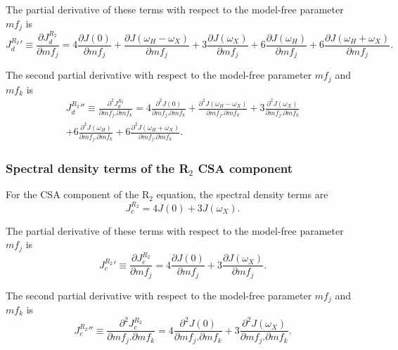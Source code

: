 \noindent The partial derivative of these terms with respect to the model-free parameter $mf_j$ is
\begin{equation}
    {J_d^{R_2}}' \equiv \frac{\partial J_d^{R_2}}{\partial mf_j}
        = 4 \frac{\partial J(0)}{\partial mf_j}
        + \frac{\partial J(\omega_H - \omega_X)}{\partial mf_j}
        + 3 \frac{\partial J(\omega_X)}{\partial mf_j}
        + 6 \frac{\partial J(\omega_H)}{\partial mf_j}
        + 6 \frac{\partial J(\omega_H + \omega_X)}{\partial mf_j}.  \label{eq: J terms: JR2d'}
\end{equation}

\noindent The second partial derivative with respect to the model-free parameter $mf_j$ and $mf_k$ is
\begin{multline}
    {J_d^{R_2}}'' \equiv \frac{\partial^2 J_d^{R_2}}{\partial mf_j . \partial mf_k}
        = 4 \frac{\partial^2 J(0)}{\partial mf_j . \partial mf_k}
        + \frac{\partial^2 J(\omega_H - \omega_X)}{\partial mf_j . \partial mf_k}
        + 3 \frac{\partial^2 J(\omega_X)}{\partial mf_j . \partial mf_k} \\
        + 6 \frac{\partial^2 J(\omega_H)}{\partial mf_j . \partial mf_k}
        + 6 \frac{\partial^2 J(\omega_H + \omega_X)}{\partial mf_j . \partial mf_k}.  \label{eq: J terms: JR2d"}
\end{multline}


\subsubsection{Spectral density terms of the R$_2$ CSA component}

For the CSA component of the R$_2$ equation, the spectral density terms are
\begin{equation}
    J_c^{R_2} = 4J(0) + 3J(\omega_X).  \label{eq: J terms: JR2c}
\end{equation}

\noindent The partial derivative of these terms with respect to the model-free parameter $mf_j$ is
\begin{equation}
    {J_c^{R_2}}' \equiv \frac{\partial J_c^{R_2}}{\partial mf_j}
        = 4 \frac{\partial J(0)}{\partial mf_j}
        + 3 \frac{\partial J(\omega_X)}{\partial mf_j}.  \label{eq: J terms: JR2c'}
\end{equation}

\noindent The second partial derivative with respect to the model-free parameter $mf_j$ and $mf_k$ is
\begin{equation}
    {J_c^{R_2}}'' \equiv \frac{\partial^2 J_c^{R_2}}{\partial mf_j . \partial mf_k}
        = 4 \frac{\partial^2 J(0)}{\partial mf_j . \partial mf_k}
        + 3 \frac{\partial^2 J(\omega_X)}{\partial mf_j . \partial mf_k}.  \label{eq: J terms: JR2c"}
\end{equation}


